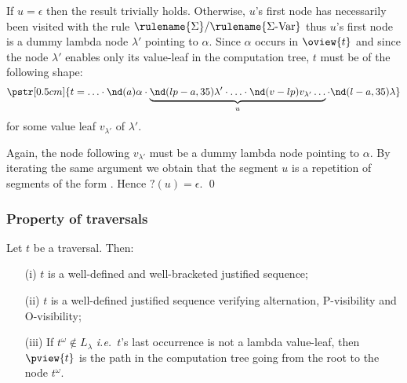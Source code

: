If $u=\epsilon$  then the result trivially holds. Otherwise, $u$'s
first node has necessarily been visited with the rule
$\rulename{\Sigma}/\rulename{\Sigma\mbox{-Var}}$ thus $u$'s first
node is a dummy lambda node $\lambda'$ pointing to $\alpha$. Since
$\alpha$ occurs in $\oview{t}$ and since the node $\lambda'$ enables
only its value-leaf in the computation tree, $t$ must be of the
following shape:
$$\pstr[0.5cm]{ t = \ldots \cdot \nd(a){\alpha} \cdot \underbrace{\nd(lp-a,35){\lambda'} \cdot  \ldots \cdot \nd(v-lp){v_{\lambda'}} \ldots }_{u} \cdot
 \nd(l-a,35){\lambda}}$$
for some value leaf $v_{\lambda'}$ of $\lambda'$.

Again, the node following $v_{\lambda'}$ must be a dummy lambda node
pointing to $\alpha$. By iterating the same argument we obtain that
the segment $u$ is a repetition of segments of the form
.
Hence $?(u)=\epsilon$. \qed



\subsubsection{Property of traversals}

\begin{proposition}
\label{prop:pviewtrav_is_path}
Let $t$ be a traversal. Then:
\begin{itemize}
\item[(i)] $t$ is a well-defined and well-bracketed justified sequence;
\item[(ii)] $t$ is a well-defined justified sequence verifying alternation, P-visibility and O-visibility;
\item[(iii)] If $t^\omega \not\in L_\lambda$ {\it i.e.}~$t$'s last occurrence is not a lambda value-leaf, then $\pview{t}$ is the path in the computation tree going from the root to the node $t^\omega$.
\end{itemize}
\end{proposition}

